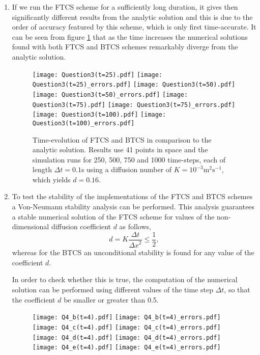 \documentclass[12pt]{article}
\begin{document}
\begin{enumerate}
\item If we run the FTCS scheme for a sufficiently long duration, it gives then significantly different results from the analytic solution and this is due to the order of accuracy featured by this scheme, which is only first time-accurate. It can be seen from figure \ref{fig:Q3} that as the time increases the numerical solutions found with both FTCS and BTCS schemes remarkably diverge from the analytic solution.

\begin{figure}[!tbh]
\centering
\texttt{[image: Question3(t=25).pdf]}
\texttt{[image: Question3(t=25)\_errors.pdf]}
\texttt{[image: Question3(t=50).pdf]}
\texttt{[image: Question3(t=50)\_errors.pdf]}
\texttt{[image: Question3(t=75).pdf]}
\texttt{[image: Question3(t=75)\_errors.pdf]}
\texttt{[image: Question3(t=100).pdf]}
\texttt{[image: Question3(t=100)\_errors.pdf]}

\caption{Time-evolution of FTCS and BTCS in comparison to the analytic solution. Results
use 41 points in space and the simulation runs for 250, 500, 750 and 1000 time-steps,
each of length $\Delta t=0.1$s using a diffusion number of $K=10^{-3}\text{m}^{2}\text{s}^{-1}$, which yields $d=0.16$.
\label{fig:Q3}}
\end{figure}

\item To test the stability of the implementations of the FTCS and BTCS schemes a Von-Neumann stability analysis can be performed. This analysis guarantees a stable numerical solution of the FTCS scheme for values of the non-dimensional diffusion coefficient $d$ as follows,
\begin{equation}
d=K\frac{\Delta t}{{\Delta x}^2} \leq \frac{1}{2},
\end{equation}
whereas for the BTCS an unconditional stability is found for any value of the coefficient $d$.\par
In order to check whether this is true, the computation of the numerical solution can be performed using different values of the time step $\Delta t$, so that the coefficient $d$ be smaller or greater than 0.5.

\begin{figure}[!tbh]
\centering
\texttt{[image: Q4\_b(t=4).pdf]}
\texttt{[image: Q4\_b(t=4)\_errors.pdf]}
\texttt{[image: Q4\_c(t=4).pdf]}
\texttt{[image: Q4\_c(t=4)\_errors.pdf]}
\texttt{[image: Q4\_d(t=4).pdf]}
\texttt{[image: Q4\_d(t=4)\_errors.pdf]}
\texttt{[image: Q4\_e(t=4).pdf]}
\texttt{[image: Q4\_e(t=4)\_errors.pdf]}


\end{figure}
\end{enumerate}
\end{document}
